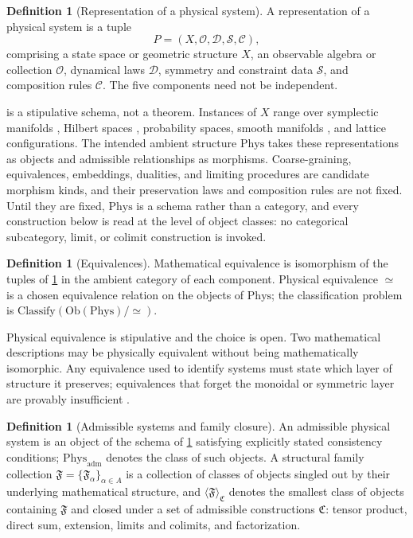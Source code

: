 \documentclass[11pt,letterpaper]{article}
\theoremstyle{definition}
\newtheorem{definition}[theorem]{Definition}
\begin{document}
\begin{definition}[Representation of a physical system]
\label{def:representation}
A representation of a physical system is a tuple
\[
  P = (X, \mathcal{O}, \mathcal{D}, \mathcal{S}, \mathcal{C}),
\]
comprising a state space or geometric structure $X$, an observable algebra or collection $\mathcal{O}$, dynamical laws $\mathcal{D}$, symmetry and constraint data $\mathcal{S}$, and composition rules $\mathcal{C}$. The five components need not be independent.
\end{definition}

 is a stipulative schema, not a theorem. Instances of $X$ range over symplectic manifolds \cite{corpus-6,corpus-7}, Hilbert spaces \cite{corpus-9}, probability spaces, smooth manifolds \cite{corpus-50,corpus-51}, and lattice configurations. The intended ambient structure $\mathrm{Phys}$ takes these representations as objects and admissible relationships as morphisms. Coarse-graining, equivalences, embeddings, dualities, and limiting procedures are candidate morphism kinds, and their preservation laws and composition rules are not fixed. Until they are fixed, $\mathrm{Phys}$ is a schema rather than a category, and every construction below is read at the level of object classes: no categorical subcategory, limit, or colimit construction is invoked.

\begin{definition}[Equivalences]
\label{def:equivalence}
Mathematical equivalence is isomorphism of the tuples of \cref{def:representation} in the ambient category of each component. Physical equivalence $\simeq$ is a chosen equivalence relation on the objects of $\mathrm{Phys}$; the classification problem is $\mathrm{Classify}(\mathrm{Ob}(\mathrm{Phys})/\simeq)$.
\end{definition}

Physical equivalence is stipulative and the choice is open. Two mathematical descriptions may be physically equivalent without being mathematically isomorphic. Any equivalence used to identify systems must state which layer of structure it preserves; equivalences that forget the monoidal or symmetric layer are provably insufficient \cite{corpus-12}.

\begin{definition}[Admissible systems and family closure]
\label{def:admissible}
An admissible physical system is an object of the schema of \cref{def:representation} satisfying explicitly stated consistency conditions; $\mathrm{Phys}_{\mathrm{adm}}$ denotes the class of such objects. A structural family collection $\mathfrak{F} = \{\mathfrak{F}_\alpha\}_{\alpha \in A}$ is a collection of classes of objects singled out by their underlying mathematical structure, and $\langle \mathfrak{F} \rangle_{\mathfrak{C}}$ denotes the smallest class of objects containing $\mathfrak{F}$ and closed under a set of admissible constructions $\mathfrak{C}$: tensor product, direct sum, extension, limits and colimits, and factorization.
\end{definition}
\end{document}

